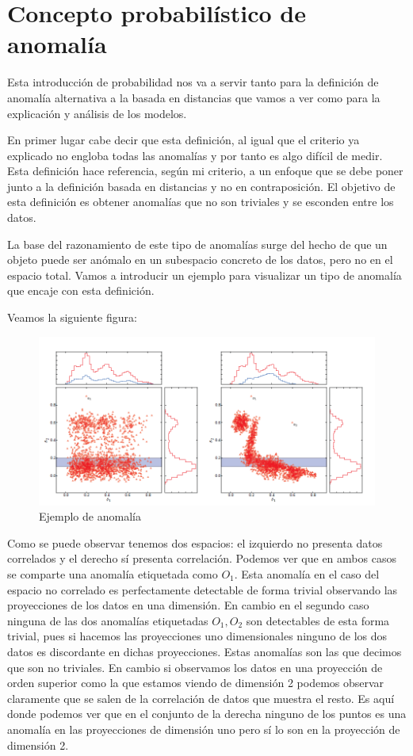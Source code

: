 \chapter{Concepto probabilístico de anomalía}
\label{chapter:anomalia_probabilidad}

Esta introducción de probabilidad nos va a servir tanto para la definición de anomalía alternativa a la basada en distancias que vamos a ver como para la explicación y análisis de los modelos.

En primer lugar cabe decir que esta definición, al igual que el criterio ya explicado no engloba todas las anomalías y por tanto es algo difícil de medir. Esta definición hace referencia, según mi criterio, a un enfoque que se debe poner junto a la definición basada en distancias y no en contraposición. El objetivo de esta definición es obtener anomalías que no son triviales y se esconden entre los datos.

La base del razonamiento de este tipo de anomalías surge del hecho de que un objeto puede ser anómalo en un subespacio concreto de los datos, pero no en el espacio total. Vamos a introducir un ejemplo para visualizar un tipo de anomalía que encaje con esta definición.

Veamos la siguiente figura:

\begin{figure}[H]
	\label{ejemplo_anomalia_probabilidad}
	\includegraphics[scale=0.6]{imagenes/ejemplo_anomalia_probabilidad}
	\caption{Ejemplo de anomalía \cite{fabian_keller_hics:_2012}}
\end{figure}

Como se puede observar tenemos dos espacios: el izquierdo no presenta datos correlados y el derecho sí presenta correlación. Podemos ver que en ambos casos se comparte una anomalía etiquetada como $O_1$. Esta anomalía en el caso del espacio no correlado es perfectamente detectable de forma trivial observando las proyecciones de los datos en una dimensión. En cambio en el segundo caso ninguna de las dos anomalías etiquetadas $O_1 , O_2$ son detectables de esta forma trivial, pues si hacemos las proyecciones uno dimensionales ninguno de los dos datos es discordante en dichas proyecciones. Estas anomalías son las que decimos que son no triviales. En cambio si observamos los datos en una proyección de orden superior como la que estamos viendo de dimensión 2 podemos observar claramente que se salen de la correlación de datos que muestra el resto. Es aquí donde podemos ver que en el conjunto de la derecha ninguno de los puntos es una anomalía en las proyecciones de dimensión uno pero sí lo son en la proyección de dimensión 2.

